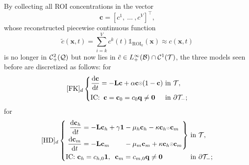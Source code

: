 \documentclass{article}
\begin{document}
                By collecting all ROI concentrations in the vector
                \[
                    \mathbf c=[c^1,\ \ldots\ ,c^V]^\top,
                \]
                whose reconstructed piecewise continuous function
                \begin{equation}
                    \tilde c(\mathbf x,t)=
                    \sum_{i=k}^Vc^k(t)\mathbb1_{\text{ROI}_k}(\mathbf x)\approx
                    c(\mathbf x,t)
                    \label{eqSpatialDiscretizedSol}
                \end{equation}
                is no longer in $\mathcal C_+^2(\mathcal Q)$ but now lies in $\tilde c\in L_+^\infty(\mathcal B)\cap\mathcal C^1(\mathcal T)$, the three models seen before are discretized as follows: for \FKcontinuous{}
                \begin{equation}
                    \refstepcounter{equation}
                    \label{eqFKDiscrete}
                    \text{[FK]$_d$}
                    \left\{
                    \begin{alignedat}{2}
                        \derT{\mathbf c}t&=-\mathbf L\mathbf c+\alpha\mathbf c\HadProd(1-\mathbf c)
                        &&\text{ in }\mathcal T,\\[2pt]
                        \text{IC:}&\;\;\mathbf c=\mathbf c_0=c_0\mathbf q\neq\boldsymbol0
                        &&\text{ in }\partial\mathcal T_-;
                    \end{alignedat}
                    \right.\notag%
                \end{equation}
                for \HDcontinuous{}
                \begin{equation}
                    \refstepcounter{equation}
                    \label{eqHDDiscrete}
                    \text{[HD]$_d$}\left\{
                    \begin{alignedat}{2}
                        &\left.\begin{alignedat}{2}
                            \derT{\mathbf c_h}t&=-\mathbf L\mathbf c_h+\gamma\bOne&&
                            -\mu_h\mathbf c_h-\kappa\mathbf c_h\HadProd\mathbf c_m\\
                            \derT{\mathbf c_m}t&=-\mathbf L\mathbf c_m&&
                            -\mu_m\mathbf c_m+\kappa\mathbf c_h\HadProd\mathbf c_m
                        \end{alignedat}\right\}
                        &&\text{ in }\mathcal T,\\
                        &\text{IC: }\mathbf c_h=c_{h,0}\boldsymbol1,\;\;
                        \mathbf c_m=c_{m,0}\mathbf q\neq\boldsymbol0
                        &&\text{ in }\partial\mathcal T_-;
                    \end{alignedat}
                    \right.\notag%
                \end{equation}
\end{document}
